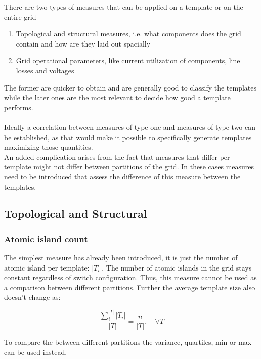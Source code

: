 There are two types of measures that can be applied on a template or on the entire grid 
\begin{enumerate}
  \item Topological and structural measures, i.e. what components does the grid contain
  and how are they laid out spacially
  \item Grid operational parameters, like current utilization of components, line losses
  and voltages
\end{enumerate}

The former are quicker to obtain and are generally good to classify the templates while
the later ones are the most relevant to decide how good a template performs.\\
\\
Ideally a correlation between measures of type one and measures of type two can be
established, as that would make it possible to specifically generate templates
maximizing those quantities.
\\
An added complication arises from the fact that measures that differ per template
might not differ between partitions of the grid. In these cases measures need to be introduced
that assess the difference of this measure between the templates. 

\subsection{Topological and Structural}\label{sec:topo_and_struct_measures}

\subsubsection{Atomic island count}\label{sec:island_count}

The simplest measure has already been introduced, it is just the number
of atomic island per template: $|T_i|$. The number of atomic
islands in the grid stays constant regardless of switch configuration.
Thus, this measure cannot be used as a comparison between different
partitions.
Further the average template size also doesn't change as: 

\begin{equation}
  \frac{\sum_i^{|T|} |T_i|}{|T|} = \frac{n}{|T|}, \quad \forall T
\end{equation}

To compare the between different partitions the variance, quartiles,
min or max can be used instead.

